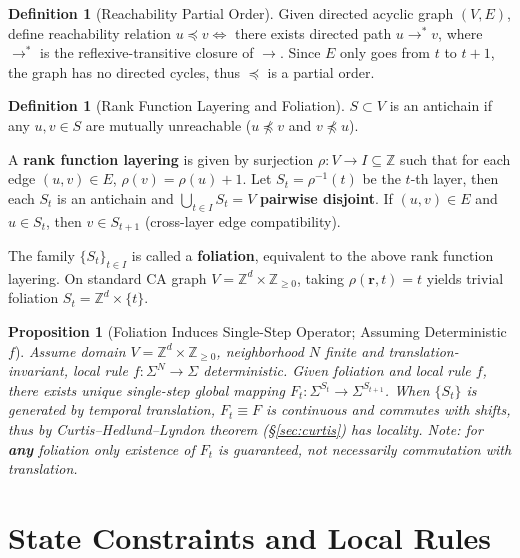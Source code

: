 \documentclass[11pt]{article}
\newtheorem{proposition}[theorem]{Proposition}
\theoremstyle{definition}
\newtheorem{definition}[theorem]{Definition}
\theoremstyle{remark}
\begin{document}
\begin{definition}[Reachability Partial Order]\label{def:partialorder}
Given directed acyclic graph \( (V,E) \), define reachability relation \( u \preceq v \iff \) there exists directed path \( u \to^* v \), where \( \to^* \) is the reflexive-transitive closure of \( \to \). Since \( E \) only goes from \( t \) to \( t{+}1 \), the graph has no directed cycles, thus \( \preceq \) is a partial order.
\end{definition}

\begin{definition}[Rank Function Layering and Foliation]\label{def:foliation}
\( S \subset V \) is an antichain if any \( u,v\in S \) are mutually unreachable (\( u \npreceq v \) and \( v \npreceq u \)).

A \textbf{rank function layering} is given by surjection \( \rho:V\to I\subseteq\mathbb Z \) such that for each edge \( (u,v)\in E \), \( \rho(v)=\rho(u)+1 \). Let \( S_t=\rho^{-1}(t) \) be the \( t \)-th layer, then each \( S_t \) is an antichain and \( \bigcup_{t\in I}S_t=V \) \textbf{pairwise disjoint}. If \( (u,v)\in E \) and \( u\in S_t \), then \( v\in S_{t+1} \) (cross-layer edge compatibility).

The family \( \{S_t\}_{t\in I} \) is called a \textbf{foliation}, equivalent to the above rank function layering. On standard CA graph \( V=\mathbb{Z}^d\times\mathbb{Z}_{\ge0} \), taking \( \rho(\mathbf r,t)=t \) yields trivial foliation \( S_t=\mathbb{Z}^d\times\{t\} \).
\end{definition}

\begin{proposition}[Foliation Induces Single-Step Operator; Assuming Deterministic \( f \)]\label{prop:foliation}
Assume domain \( V=\mathbb Z^d\times\mathbb Z_{\ge0} \), neighborhood \( N \) finite and translation-invariant, local rule \( f:\Sigma^{N}\to\Sigma \) deterministic. Given foliation and local rule \( f \), there exists unique single-step global mapping \( F_t:\Sigma^{S_t}\to\Sigma^{S_{t+1}} \). When \( \{S_t\} \) is generated by temporal translation, \( F_t\equiv F \) is continuous and commutes with shifts, thus by Curtis--Hedlund--Lyndon theorem (§\ref{sec:curtis}) has locality. Note: for \textbf{any} foliation only existence of \( F_t \) is guaranteed, not necessarily commutation with translation.
\end{proposition}

\section{State Constraints and Local Rules}\label{sec:constraints}
\end{document}

